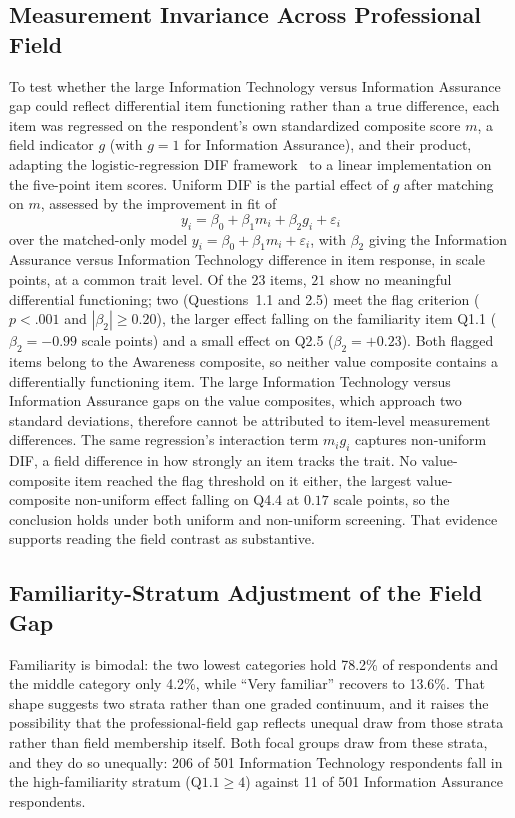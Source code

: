 \subsection{Measurement Invariance Across Professional Field}

To test whether the large Information Technology versus Information Assurance gap could reflect differential item functioning rather than a true difference, each item was regressed on the respondent's own standardized composite score $m$, a field indicator $g$ (with $g=1$ for Information Assurance), and their product, adapting the logistic-regression DIF framework~\parencite{Zumbo_1999} to a linear implementation on the five-point item scores. Uniform DIF is the partial effect of $g$ after matching on $m$, assessed by the improvement in fit of
\begin{equation}
  y_i = \beta_0 + \beta_1 m_i + \beta_2 g_i + \varepsilon_i
\end{equation}
over the matched-only model $y_i=\beta_0+\beta_1 m_i+\varepsilon_i$, with $\beta_2$ giving the Information Assurance versus Information Technology difference in item response, in scale points, at a common trait level. Of the $23$ items, $21$ show no meaningful differential functioning; two (Questions~1.1 and 2.5) meet the flag criterion ($p<.001$ and $|\beta_2|\ge0.20$), the larger effect falling on the familiarity item Q1.1 ($\beta_2=-0.99$ scale points) and a small effect on Q2.5 ($\beta_2=+0.23$). Both flagged items belong to the Awareness composite, so neither value composite contains a differentially functioning item. The large Information Technology versus Information Assurance gaps on the value composites, which approach two standard deviations, therefore cannot be attributed to item-level measurement differences. The same regression's interaction term $m_i g_i$ captures non-uniform DIF, a field difference in how strongly an item tracks the trait. No value-composite item reached the flag threshold on it either, the largest value-composite non-uniform effect falling on Q4.4 at $0.17$ scale points, so the conclusion holds under both uniform and non-uniform screening. That evidence supports reading the field contrast as substantive.

\subsection{Familiarity-Stratum Adjustment of the Field Gap}

Familiarity is bimodal: the two lowest categories hold 78.2\% of respondents and the middle category only 4.2\%, while ``Very familiar'' recovers to 13.6\%. That shape suggests two strata rather than one graded continuum, and it raises the possibility that the professional-field gap reflects unequal draw from those strata rather than field membership itself. Both focal groups draw from these strata, and they do so unequally: 206 of 501 Information Technology respondents fall in the high-familiarity stratum ($\text{Q1.1}\ge4$) against 11 of 501 Information Assurance respondents.

